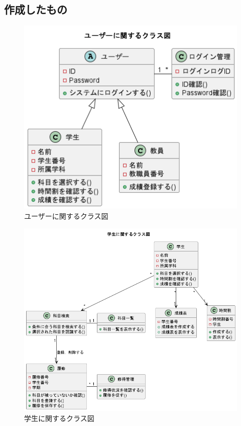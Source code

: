 \documentclass[documentclass]{jsarticle}
\begin{document}
\subsection*{作成したもの}

\begin{figure}[H]
  \begin{center}
    \includegraphics*[scale=0.4]{figure/5-2.png}
  \end{center}
  \caption{ユーザーに関するクラス図}
  \label{fig:5-2}
\end{figure}

\begin{figure}[H]
  \begin{center}
    \includegraphics*[scale=0.4]{figure/5-3.png}
  \end{center}
  \caption{学生に関するクラス図}
  \label{fig:5-3}
\end{figure}
\end{document}
